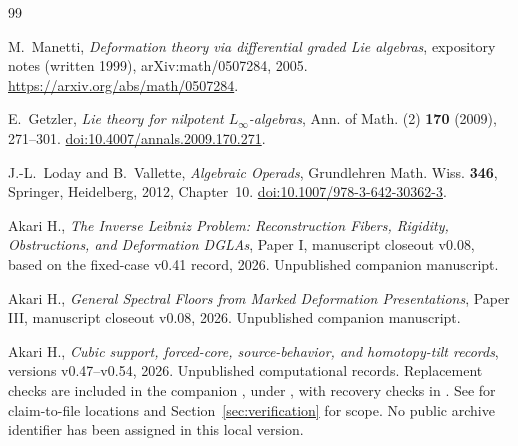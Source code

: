 \documentclass[11pt]{amsart}
\begin{document}
\clearpage
\begin{thebibliography}{99}
\raggedright

M.~Manetti,
\emph{Deformation theory via differential graded Lie algebras},
expository notes (written 1999), arXiv:math/0507284, 2005.
\url{https://arxiv.org/abs/math/0507284}.

E.~Getzler,
\emph{Lie theory for nilpotent $L_\infty$-algebras},
Ann. of Math. (2) \textbf{170} (2009), 271--301.
\href{https://doi.org/10.4007/annals.2009.170.271}{doi:10.4007/annals.2009.170.271}.

J.-L.~Loday and B.~Vallette,
\emph{Algebraic Operads}, Grundlehren Math. Wiss. \textbf{346},
Springer, Heidelberg, 2012, Chapter~10.
\href{https://doi.org/10.1007/978-3-642-30362-3}{doi:10.1007/978-3-642-30362-3}.

Akari H.,
\emph{The Inverse Leibniz Problem: Reconstruction Fibers, Rigidity, Obstructions, and Deformation DGLAs},
Paper I, manuscript closeout v0.08, based on the fixed-case v0.41 record, 2026.
Unpublished companion manuscript.

Akari H.,
\emph{General Spectral Floors from Marked Deformation Presentations},
Paper III, manuscript closeout v0.08, 2026. Unpublished companion manuscript.

Akari H.,
\emph{Cubic support, forced-core, source-behavior, and homotopy-tilt records},
versions v0.47--v0.54, 2026. Unpublished computational records.
Replacement checks are included in the companion
, under
, with recovery checks in
.
See  for claim-to-file locations and
Section~\ref{sec:verification} for scope. No public archive identifier
has been assigned in this local version.
\end{thebibliography}
\end{document}
